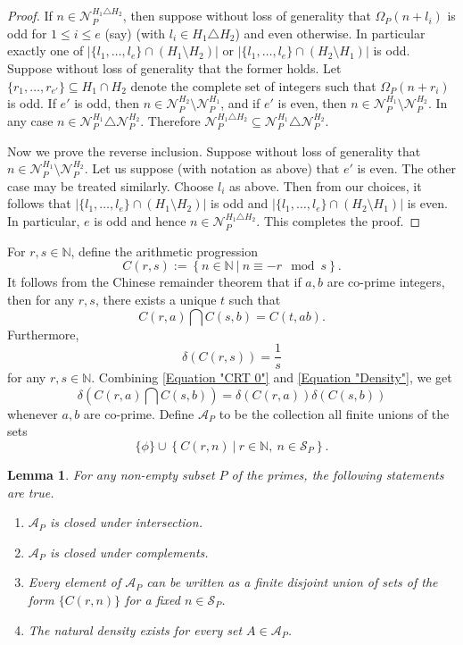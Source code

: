 \documentclass[12pt, a4paper]{amsart}
\newtheorem{lemma}{Lemma}
\theoremstyle{remark}
\theoremstyle{proof}
\numberwithin{equation}{section}
\numberwithin{assumption}{section}
\newcommand{\N}{\mathbb{N}}
\begin{document}
\begin{proof}
		If $n\in \mathcal{N}_P^{H_1\triangle H_2}$, then suppose without loss of generality that $\Omega_P(n+l_i)$ is odd for $1\leqslant i\leqslant e$ (say) (with $l_i\in H_1\triangle H_2$) and  even otherwise. In particular exactly one of $|\{l_1,\ldots,l_e\}\cap (H_1\setminus H_2)|$ or $|\{l_1,\ldots,l_e\}\cap (H_2\setminus H_1)|$ is odd. Suppose without loss of generality that the former holds. Let $\{r_1,\ldots, r_{e'}\}\subseteq H_1\cap H_2$ denote the complete set of integers such that $\Omega_P(n+r_i)$ is odd. If $e'$ is odd, then $n\in \mathcal{N}_P^{H_2}\setminus  \mathcal{N}_P^{H_1}$, and if $e'$ is even, then $n\in \mathcal{N}_P^{H_1}\setminus  \mathcal{N}_P^{H_2}$. In any case $n\in \mathcal{N}_P^{H_1}\triangle \mathcal{N}_P^{H_2}$. Therefore $\mathcal{N}_P^{H_1\triangle H_2}\subseteq \mathcal{N}_P^{H_1}\triangle \mathcal{N}_P^{H_2}$.
		
		Now we prove the reverse inclusion. Suppose without loss of generality that $n\in \mathcal{N}_P^{H_1}\setminus  \mathcal{N}_P^{H_2} $. Let us suppose (with notation as above) that $e'$ is even. The other case may be treated similarly. Choose $l_i$ as above. Then from our choices, it follows that $|\{l_1,\ldots,l_e\}\cap (H_1\setminus H_2)|$ is odd and $|\{l_1,\ldots,l_e\}\cap (H_2\setminus H_1)|$ is even. In particular, $e$ is odd and hence $n\in \mathcal{N}_P^{H_1\triangle H_2}$. This completes the proof.
	\end{proof}	
	
	
	For $r,s\in \N$, define the arithmetic progression
	\[
	C(r,s):=\left\{n\in \N\ |\ n\equiv -r \mod s\right\}.
	\]
	It follows from the Chinese remainder theorem that if $ a,b $ are co-prime integers, then for any $ r,s $, there exists a unique $ t $ such that 
	\begin{equation}\label{Equation "CRT 0"}
		C(r,a)\bigcap C(s,b) = C(t,ab).
	\end{equation}
	Furthermore, 
	\begin{equation}\label{Equation "Density"}
		\delta(C(r,s)) = \frac{1}{s}
	\end{equation}
	for any $r,s\in \N$. Combining \eqref{Equation "CRT 0"} and \eqref{Equation "Density"}, we get
	\[
	\delta\left(C(r,a)\bigcap C(s,b)\right) = \delta\left(C(r,a)\right) \delta\left(C(s,b)\right)
	\]
	whenever $a,b$ are co-prime. Define $\mathcal{A}_P$ to be the collection all finite unions of the sets
	\[
	\{ \phi\}\cup\left\{C(r,n)\ |\ r\in \N,\ n\in \mathcal{S}_P\right\}.
	\]
	\begin{lemma}\label{Lemma "Properties of AP"}
		For any non-empty subset $P$ of the primes, the following statements are true.
		\begin{enumerate}
			\item	$\mathcal{A}_P$ is closed under intersection.
			\item 	$\mathcal{A}_P$ is closed under complements.
			\item 	Every element of $\mathcal{A}_P$ can be written as a finite disjoint union of sets of the form $\{C(r,n)\}$ for a fixed $n\in \mathcal{S}_P$.
			\item 	The natural density exists for every set $A\in \mathcal{A}_P$.
		\end{enumerate}
	\end{lemma}
	
\end{document}
